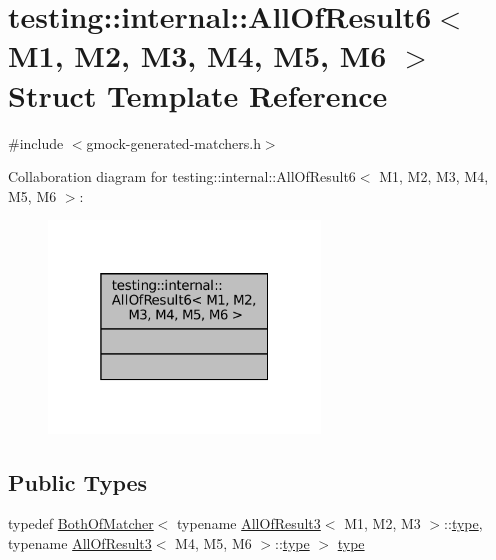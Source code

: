\hypertarget{structtesting_1_1internal_1_1AllOfResult6}{}\section{testing\+:\+:internal\+:\+:All\+Of\+Result6$<$ M1, M2, M3, M4, M5, M6 $>$ Struct Template Reference}
\label{structtesting_1_1internal_1_1AllOfResult6}


{\ttfamily \#include $<$gmock-\/generated-\/matchers.\+h$>$}



Collaboration diagram for testing\+:\+:internal\+:\+:All\+Of\+Result6$<$ M1, M2, M3, M4, M5, M6 $>$\+:
\nopagebreak
\begin{figure}[H]
\begin{center}
\leavevmode
\includegraphics[width=205pt]{structtesting_1_1internal_1_1AllOfResult6__coll__graph}
\end{center}
\end{figure}
\subsection*{Public Types}
\begin{DoxyCompactItemize}
\item 
typedef \hyperlink{classtesting_1_1internal_1_1BothOfMatcher}{Both\+Of\+Matcher}$<$ typename \hyperlink{structtesting_1_1internal_1_1AllOfResult3}{All\+Of\+Result3}$<$ M1, M2, M3 $>$\+::\hyperlink{structtesting_1_1internal_1_1AllOfResult6_a5385655911ce2c1d3fccd802c1754139}{type}, typename \hyperlink{structtesting_1_1internal_1_1AllOfResult3}{All\+Of\+Result3}$<$ M4, M5, M6 $>$\+::\hyperlink{structtesting_1_1internal_1_1AllOfResult6_a5385655911ce2c1d3fccd802c1754139}{type} $>$ \hyperlink{structtesting_1_1internal_1_1AllOfResult6_a5385655911ce2c1d3fccd802c1754139}{type}
\end{DoxyCompactItemize}



